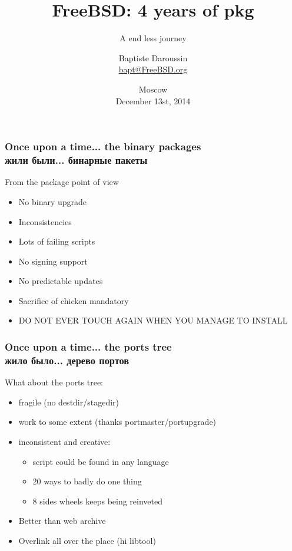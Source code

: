 
\newcommand{\prestitle}{RuBSD 14}

\title{FreeBSD: 4 years of pkg}
\subtitle{A end less journey}
\author{Baptiste Daroussin \\ \url{bapt@FreeBSD.org}}
\date{Moscow \\ December 13st, 2014}


\begin{frame}[plain]
	\titlepage
\end{frame}

\begin{frame}
	\frametitle{Once upon a time... the binary packages \\ жили были... бинарные пакеты}
	From the package point of view
	\begin{itemize}
		\item No binary upgrade
		\item Inconsistencies
		\item Lots of failing scripts
		\item No signing support
		\item No predictable updates
		\item Sacrifice of chicken mandatory
		\item DO NOT EVER TOUCH AGAIN WHEN YOU MANAGE TO INSTALL
	\end{itemize}
\end{frame}

\begin{frame}
	\frametitle{Once upon a time... the ports tree \\ жило было... дерево портов}
	What about the ports tree:
	\begin{itemize}
		\item fragile (no destdir/stagedir)
		\item work to some extent (thanks portmaster/portupgrade)
		\item inconsistent and creative:
			\begin{itemize}
				\item script could be found in any language
				\item 20 ways to badly do one thing
				\item 8 sides wheels keeps being reinveted
			\end{itemize}
		\item Better than web archive
		\item Overlink all over the place (hi libtool)
	\end{itemize}
\end{frame}

